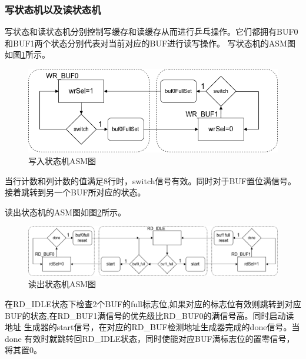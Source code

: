 \documentclass{article}
\numberwithin {equation}{section}
\begin{document}
\begin{spacing}{1.25}
      \subsubsection{写状态机以及读状态机}
      写状态和读状态机分别控制写缓存和读缓存从而进行乒乓操作。它们都拥有BUF0
      和BUF1两个状态分别代表对当前对应的BUF进行读写操作。
      写状态机的ASM图如图\ref{wrASM}所示。
      \begin{figure}[H]
        \centering
        \includegraphics[scale=0.45]{./pictures/wrASM.png}
        \caption{写入状态机ASM图}
        \label{wrASM}
      \end{figure}
      当行计数和列计数的值满足8行时，switch信号有效。同时对于BUF置位满信号。
      接着跳转到另一个BUF所对应的状态。

      读出状态机的ASM图如图\ref{rdASM}所示。
      \begin{figure}[H]
        \centering
        \includegraphics[scale=0.45]{./pictures/rdASM.png}
        \caption{读出状态机ASM图}
        \label{rdASM}
      \end{figure}
      在RD\_IDLE状态下检查2个BUF的full标志位,如果对应的标志位有效则跳转到对应
      BUF的状态,在RD\_BUF1满信号的优先级比RD\_BUF0的满信号高。同时启动读地址
      生成器的start信号，在对应的RD\_BUF检测地址生成器完成的done信号。当done
      有效时就跳转回RD\_IDLE状态，同时使能对应BUF满标志位的置零信号，将其置0。


\end{spacing}
\end{document}
